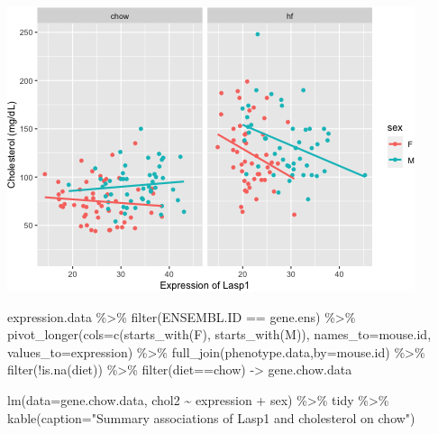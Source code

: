 \documentclass[
]{article}
\newenvironment{Shaded}{\begin{snugshade}}{\end{snugshade}}
\newcommand{\AttributeTok}[1]{\textcolor[rgb]{0.77,0.63,0.00}{#1}}
\newcommand{\FunctionTok}[1]{\textcolor[rgb]{0.00,0.00,0.00}{#1}}
\newcommand{\NormalTok}[1]{#1}
\newcommand{\OtherTok}[1]{\textcolor[rgb]{0.56,0.35,0.01}{#1}}
\newcommand{\SpecialCharTok}[1]{\textcolor[rgb]{0.00,0.00,0.00}{#1}}
\newcommand{\StringTok}[1]{\textcolor[rgb]{0.31,0.60,0.02}{#1}}
\begin{document}
\includegraphics{figures/Lasp1-associations-1.png}

\begin{Shaded}
\begin{Highlighting}[]
\NormalTok{expression.data }\SpecialCharTok{\%\textgreater{}\%}
  \FunctionTok{filter}\NormalTok{(ENSEMBL.ID }\SpecialCharTok{==}\NormalTok{ gene.ens) }\SpecialCharTok{\%\textgreater{}\%}
  \FunctionTok{pivot\_longer}\NormalTok{(}\AttributeTok{cols=}\FunctionTok{c}\NormalTok{(}\FunctionTok{starts\_with}\NormalTok{(}\StringTok{\textquotesingle{}F\textquotesingle{}}\NormalTok{),}
                      \FunctionTok{starts\_with}\NormalTok{(}\StringTok{\textquotesingle{}M\textquotesingle{}}\NormalTok{)),}
               \AttributeTok{names\_to=}\StringTok{\textquotesingle{}mouse.id\textquotesingle{}}\NormalTok{,}
               \AttributeTok{values\_to=}\StringTok{\textquotesingle{}expression\textquotesingle{}}\NormalTok{) }\SpecialCharTok{\%\textgreater{}\%}
  \FunctionTok{full\_join}\NormalTok{(phenotype.data,}\AttributeTok{by=}\StringTok{\textquotesingle{}mouse.id\textquotesingle{}}\NormalTok{) }\SpecialCharTok{\%\textgreater{}\%}
  \FunctionTok{filter}\NormalTok{(}\SpecialCharTok{!}\FunctionTok{is.na}\NormalTok{(diet)) }\SpecialCharTok{\%\textgreater{}\%}
  \FunctionTok{filter}\NormalTok{(diet}\SpecialCharTok{==}\StringTok{\textquotesingle{}chow\textquotesingle{}}\NormalTok{) }\OtherTok{{-}\textgreater{}}\NormalTok{ gene.chow.data}

\FunctionTok{lm}\NormalTok{(}\AttributeTok{data=}\NormalTok{gene.chow.data, chol2 }\SpecialCharTok{\textasciitilde{}}\NormalTok{ expression }\SpecialCharTok{+}\NormalTok{ sex) }\SpecialCharTok{\%\textgreater{}\%}
\NormalTok{  tidy }\SpecialCharTok{\%\textgreater{}\%}
  \FunctionTok{kable}\NormalTok{(}\AttributeTok{caption=}\StringTok{"Summary associations of Lasp1 and cholesterol on chow"}\NormalTok{)}
\end{Highlighting}
\end{Shaded}
\end{document}
